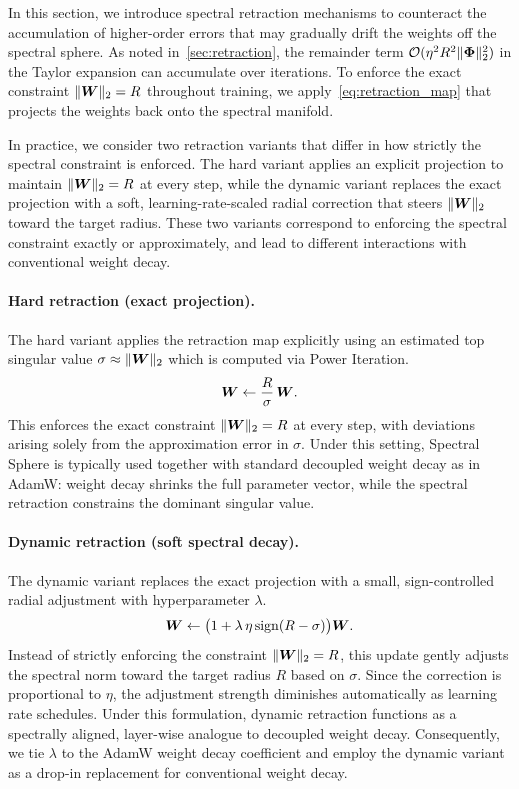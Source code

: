 In this section, we introduce spectral retraction mechanisms to counteract the accumulation of higher-order errors that may gradually drift the weights off the spectral sphere. As noted in~\cref{sec:retraction}, the remainder term $\mathcal{O}(\eta^2 R^2 \|{\bm{\Phi}}\|_2^2)$ in the Taylor expansion can accumulate over iterations. To enforce the exact constraint $\|{\bm{W}}\|_2=R$ throughout training, we apply~\cref{eq:retraction_map} that projects the weights back onto the spectral manifold.

In practice, we consider two retraction variants that differ in how strictly the spectral constraint is enforced. The hard variant applies an explicit projection to maintain $\|{\bm{W}}\|_2 = R$ at every step, while the dynamic variant replaces the exact projection with a soft, learning-rate-scaled radial correction that steers $\|{\bm{W}}\|_2$ toward the target radius. These two variants correspond to enforcing the spectral constraint exactly or approximately, and lead to different interactions with conventional weight decay.

\paragraph{Hard retraction (exact projection).}
The hard variant applies the retraction map explicitly using an estimated top singular value $\sigma \approx \|{\bm{W}}\|_2$ which is computed via Power Iteration.
\begin{equation}
{\bm{W}} \gets \frac{R}{\sigma}\,{\bm{W}}.
\end{equation}
This enforces the exact constraint $\|{\bm{W}}\|_2 = R$ at every step, with deviations arising solely from the approximation error in $\sigma$.
Under this setting, Spectral Sphere is typically used together with standard decoupled weight decay as in AdamW: weight decay shrinks the full parameter vector, while the spectral retraction constrains the dominant singular value.

\paragraph{Dynamic retraction (soft spectral decay).}
The dynamic variant replaces the exact projection with a small, sign-controlled radial adjustment with hyperparameter $\lambda$.
\begin{equation}
{\bm{W}} \gets \bigl(1 + \lambda\,\eta\operatorname{sign}(R-\sigma)\bigr){\bm{W}}.
\end{equation}
Instead of strictly enforcing the constraint $\|{\bm{W}}\|_2 = R$, this update gently adjusts the spectral norm toward the target radius $R$ based on $\sigma$. Since the correction is proportional to $\eta$, the adjustment strength diminishes automatically as learning rate schedules. Under this formulation, dynamic retraction functions as a spectrally aligned, layer-wise analogue to decoupled weight decay. Consequently, we tie $\lambda$ to the AdamW weight decay coefficient and employ the dynamic variant as a drop-in replacement for conventional weight decay.

